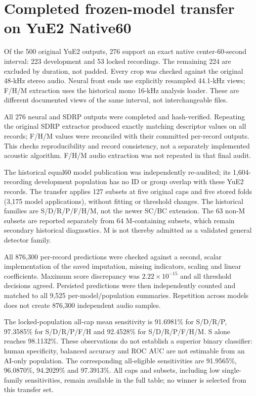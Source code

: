 \section{Completed frozen-model transfer on YuE2 Native60}
\label{sec:yue2-native60}
Of the 500 original YuE2 outputs, 276 support an exact native center-60-second
interval: 223 development and 53 locked recordings. The remaining 224 are
excluded by duration, not padded. Every crop was checked against the original
48-kHz stereo audio. Neural front ends use explicitly resampled 44.1-kHz views;
F/H/M extraction uses the historical mono 16-kHz analysis loader. These are
different documented views of the same interval, not interchangeable files.

All 276 neural and SDRP outputs were completed and hash-verified. Repeating the
original SDRP extractor produced exactly matching descriptor values on all
records; F/H/M values were reconciled with their committed per-record outputs.
This checks reproducibility and record consistency, not a separately implemented
acoustic algorithm. F/H/M audio extraction was not repeated in that final audit.

The historical equal60 model publication was independently re-audited; its
1,604-recording development population has no ID or group overlap with these
YuE2 records. The transfer applies 127 subsets at five original caps and five
stored folds (3,175 model applications), without fitting or threshold changes.
The historical families are S/D/R/P/F/H/M, not the newer SC/BC extension.
The 63 non-M subsets are reported separately from 64 M-containing subsets,
which remain secondary historical diagnostics. M is not thereby admitted as a
validated general detector family.

All 876,300 per-record predictions were checked against a second, scalar
implementation of the saved imputation, missing indicators, scaling and linear
coefficients. Maximum score discrepancy was $2.22\times10^{-15}$ and all
threshold decisions agreed. Persisted predictions were then independently
counted and matched to all 9,525 per-model/population summaries. Repetition
across models does not create 876,300 independent audio samples.



The locked-population all-cap mean sensitivity is 91.6981\% for S/D/R/P,
97.3585\% for S/D/R/P/F/H and 92.4528\% for S/D/R/P/F/H/M. S alone reaches
98.1132\%. These observations do not establish a superior binary classifier:
human specificity, balanced accuracy and ROC AUC are not estimable from an
AI-only population. The corresponding all-eligible sensitivities are 91.9565\%,
96.0870\%, 94.2029\% and 97.3913\%. All caps and subsets, including low
single-family sensitivities, remain available in the full table; no winner is
selected from this transfer set.

